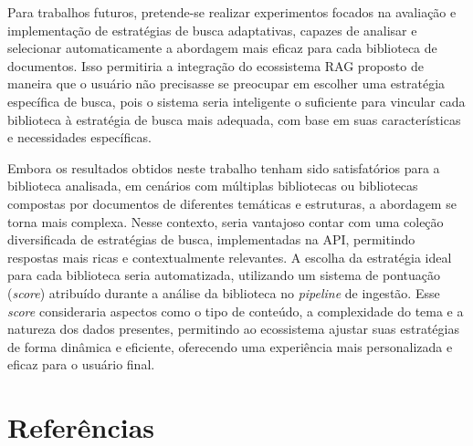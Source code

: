 \documentclass[a4paper, 12pt]{article}
\begin{document}
    Para trabalhos futuros, pretende-se realizar experimentos focados na avaliação e implementação de estratégias de busca adaptativas, capazes de analisar e selecionar automaticamente a abordagem mais eficaz para cada biblioteca de documentos. Isso permitiria a integração do ecossistema RAG proposto de maneira que o usuário não precisasse se preocupar em escolher uma estratégia específica de busca, pois o sistema seria inteligente o suficiente para vincular cada biblioteca à estratégia de busca mais adequada, com base em suas características e necessidades específicas.

    Embora os resultados obtidos neste trabalho tenham sido satisfatórios para a biblioteca analisada, em cenários com múltiplas bibliotecas ou bibliotecas compostas por documentos de diferentes temáticas e estruturas, a abordagem se torna mais complexa. Nesse contexto, seria vantajoso contar com uma coleção diversificada de estratégias de busca, implementadas na API, permitindo respostas mais ricas e contextualmente relevantes. A escolha da estratégia ideal para cada biblioteca seria automatizada, utilizando um sistema de pontuação (\textit{score}) atribuído durante a análise da biblioteca no \textit{pipeline} de ingestão. Esse \textit{score} consideraria aspectos como o tipo de conteúdo, a complexidade do tema e a natureza dos dados presentes, permitindo ao ecossistema ajustar suas estratégias de forma dinâmica e eficiente, oferecendo uma experiência mais personalizada e eficaz para o usuário final.

    \clearpage

    \section*{Referências}

    \nocite{*}

    \sectionfont{\raggedright}
    \printbibliography
    
\end{document}
